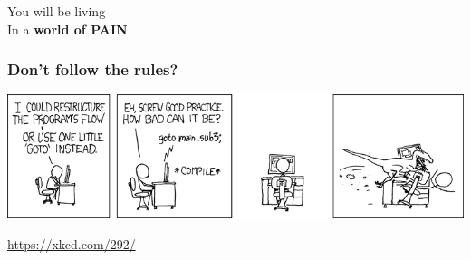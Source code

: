 \documentclass[xcolor={x11names,svgnames}]{beamer}
\begin{document}

\begin{frame}[label=world_of_pain]
  \Huge

  
    \begin{center}


  \pause
  \bigskip
  

  \pause
  \bigskip
  
  \scalebox{1.1}You will be living \\
  In a \textbf{world   of \alert{PAIN}}
\end{center}
\end{frame}


\begin{frame}
  \frametitle{Don't follow the rules?}

  \centering
  \includegraphics[width=\textwidth]{goto.png}

  \medskip

  \url{https://xkcd.com/292/}
\end{frame}

\end{document}

